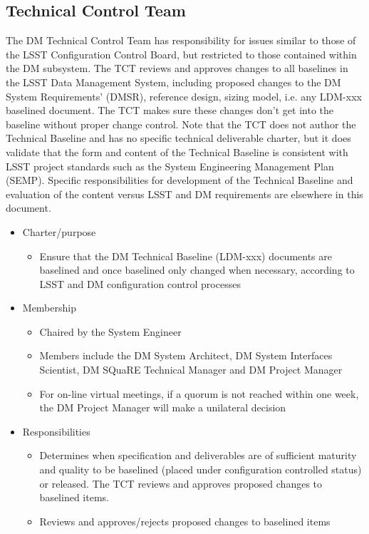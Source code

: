 \subsection{Technical Control Team \label{sect:tct}}
The DM Technical Control Team has responsibility for issues similar to those of the LSST Configuration Control Board, but restricted to those contained within the DM subsystem. The TCT reviews and approves changes to all baselines in the LSST Data Management System, including proposed changes to the DM System Requirements' (DMSR), reference design, sizing model, i.e. any LDM-xxx baselined document.  The TCT makes sure these changes don't get into the baseline without proper change control.  Note that the TCT does not author the Technical Baseline and has no specific technical deliverable charter, but it does validate that the form and content of the Technical Baseline is consistent with LSST project standards such as the System Engineering Management Plan (SEMP).  Specific responsibilities for development of the Technical Baseline and evaluation of the content versus LSST and DM requirements are elsewhere in this document.
\begin{itemize}
\item Charter/purpose
	\begin{itemize}
	\item Ensure that the DM Technical Baseline (LDM-xxx) documents are baselined and once baselined only changed when necessary, according to LSST and DM configuration control processes
	\end{itemize}
\item Membership
	\begin{itemize}
	\item Chaired by the System Engineer
	\item Members include the DM System Architect, DM System Interfaces Scientist, DM SQuaRE Technical Manager and DM Project Manager
	\item For on-line virtual meetings, if a quorum is not reached within one week, the DM Project Manager will make a unilateral decision
	\end{itemize}
\item Responsibilities
	\begin{itemize}
	\item Determines when specification and deliverables are of sufficient maturity and quality to be baselined (placed under configuration controlled status) or released. The TCT reviews and approves proposed changes to baselined items.
	\item Reviews and approves/rejects proposed changes to baselined items
	\end{itemize}
\end{itemize}


